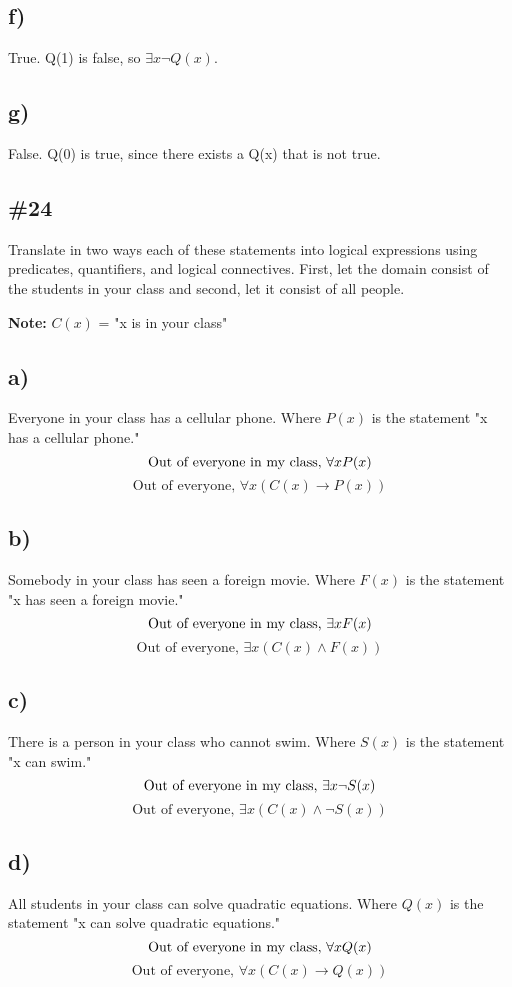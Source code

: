 \documentclass{article}
\newcommand{\problem}[1]{\subsection{\##1}}
\renewcommand{\And}{\wedge}
\begin{document}
\subsection{f)}
True. Q(1) is false, so \(\exists x \neg Q(x)\).
\subsection{g)}
False. Q(0) is true, since there exists a Q(x) that is not true.
\pagebreak
\problem{24}
Translate in two ways each of these statements into logical expressions using predicates, quantifiers, and logical connectives. First, let the domain consist of the students in your class and second, let it consist of all people.

\textbf{Note:} \(C(x)\) = "x is in your class"

\subsection{a)}
Everyone in your class has a cellular phone. Where \(P(x)\) is the statement "x has a cellular phone."
\[
    \text{Out of everyone in my class, } \forall xP(x) \\
\]
\[
    \text{Out of everyone, } \forall x(C(x) \rightarrow P(x))  
\]

\subsection{b)}
Somebody in your class has seen a foreign movie. Where \(F(x)\) is the statement "x has seen a foreign movie."
\[
    \text{Out of everyone in my class, } \exists xF(x) \\
\]
\[
    \text{Out of everyone, } \exists x(C(x) \And F(x))
\]
\subsection{c)}
There is a person in your class who cannot swim. Where \(S(x)\) is the statement "x can swim."
\[
    \text{Out of everyone in my class, } \exists x \neg S(x) \\
\]
\[
    \text{Out of everyone, } \exists x(C(x) \And \neg S(x))
\]
\subsection{d)}
All students in your class can solve quadratic equations. Where \(Q(x)\) is the statement "x can solve quadratic equations."
\[
    \text{Out of everyone in my class, } \forall xQ(x) \\
\]
\[
    \text{Out of everyone, } \forall x(C(x) \rightarrow Q(x))
\]
\end{document}
